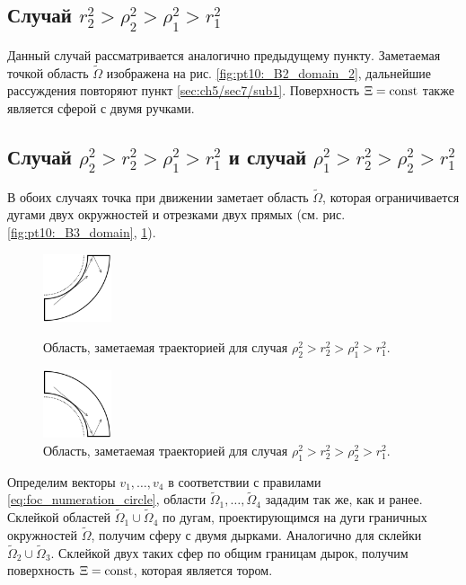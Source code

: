\subsection{Случай  $r_2^2 > \rho_2^2 > \rho_1^2 > r_1^2$}\label{sec:ch5/sec7/sub2}
Данный случай рассматривается аналогично предыдущему пункту. Заметаемая точкой область $\widetilde{\Omega}$ изображена на рис. \ref{fig:pt10:_B2_domain_2}, дальнейшие рассуждения повторяют пункт \ref{sec:ch5/sec7/sub1}. Поверхность $\Xi = \mathrm{const}$ также является сферой с двумя ручками.

\subsection{Случай  $\rho_2^2 > r_2^2 > \rho_1^2 > r_1^2$ и случай $\rho_1^2 > r_2^2 > \rho_2^2 > r_1^2$}\label{sec:ch5/sec7/sub3}
В обоих случаях  точка при движении заметает область $\widetilde{\Omega}$, которая ограничивается дугами двух окружностей и отрезками двух прямых (см. рис. \ref{fig:pt10:_B3_domain}, \ref{fig:pt10:_B4_domain}).
\begin{figure}[!htb]
\centering
\includegraphics[width=2cm]{images/ch4/section3_circular/atoms/sect3_B3_domain.pdf}
    \caption{Область, заметаемая траекторией для случая $\rho_2^2 > r_2^2 > \rho_1^2 > r_1^2$.}
    \label{fig:pt10:_B3_domain}
\endminipage\hfill
{}
\centering
\includegraphics[width=2cm]{images/ch4/section3_circular/atoms/sect3_B4_domain.pdf}
    \caption{Область, заметаемая траекторией для случая $\rho_1^2 > r_2^2 > \rho_2^2 > r_1^2$.}
        \label{fig:pt10:_B4_domain}
\endminipage\hfill
\end{figure}

Определим векторы $v_1, \ldots, v_4$ в соответствии с правилами \eqref{eq:foc_numeration_circle}, области $\widetilde{\Omega}_1, \ldots, \widetilde{\Omega}_4$ зададим так же, как и ранее.
Склейкой областей $\widetilde{\Omega}_1 \cup \widetilde{\Omega}_4$ по дугам, проектирующимся на дуги граничных окружностей $\widetilde{\Omega}$, получим сферу с двумя дырками. Аналогично для склейки $\widetilde{\Omega}_2 \cup \widetilde{\Omega}_3$. Склейкой двух таких сфер по общим границам дырок, получим поверхность $\Xi = \mathrm{const}$, которая является тором.


